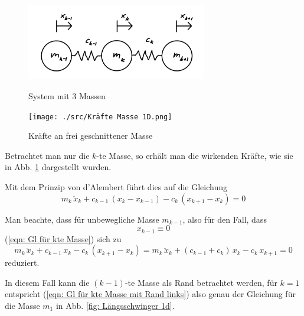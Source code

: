 \documentclass[a4paper,12pt]{report}
\theoremstyle{plain} %
\theoremstyle{definition} %
\theoremstyle{remark}
\begin{document}
            \begin{figure}[ht]
                  \centering
                  \begin{minipage}[ht]{0.49\linewidth}
                        \centering
                        \includegraphics[width=0.7\textwidth, keepaspectratio]{./src/3 Massen System.png}
                        \caption{System mit 3 Massen}
                        \label{fig: 3 Massen System}
                  \end{minipage}
                  \hfill
                  \begin{minipage}[ht]{0.49\linewidth}
                        \centering
                        \texttt{[image: ./src/Kräfte Masse 1D.png]}
                        \caption{Kräfte an frei geschnittener Masse}
                        \label{fig: Kräfte Masse 1D}
                  \end{minipage}
            \end{figure}

            Betrachtet man nur die $k$-te Masse, so erhält man die wirkenden Kräfte, wie sie in Abb. \ref{fig: Kräfte Masse 1D} dargestellt wurden.

            Mit dem Prinzip von d'Alembert führt dies auf die Gleichung
            \begin{equation}
                  \label{eqn: Gl für kte Masse}
                  m_k\,\ddot x_k + c_{k-1}\,(x_k-x_{k-1}) - c_k\,(x_{k+1}-x_k) = 0
            \end{equation}

            Man beachte, dass für unbewegliche Masse $m_{k-1}$, also für den Fall, dass
            $$x_{k-1} \equiv 0$$
            (\ref{eqn: Gl für kte Masse}) sich zu
            \begin{equation}
                  \label{eqn: Gl für kte Masse mit Rand links}
                  m_k\,\ddot x_k + c_{k-1}\,x_k - c_k\,(x_{k+1}-x_k) = m_k\,\ddot x_k + (c_{k-1}+c_k)\,x_k -c_k\,x_{k+1} = 0
            \end{equation}
            reduziert.

            In diesem Fall kann die $(k-1)$-te Masse als Rand betrachtet werden, für $k=1$ entspricht (\ref{eqn: Gl für kte Masse mit Rand links}) also genau der Gleichung für die Masse $m_1$ in Abb. \ref{fig: Längsschwinger 1d}.
\end{document}

